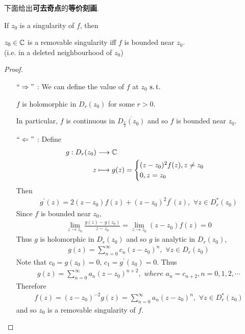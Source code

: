 	下面给出\textbf{可去奇点}的\textbf{等价刻画}.
	\begin{thm}\label{thm 8.3.1}
		If $z_0$ is a singularity of $f$, then 
		\begin{center}
			$z_0 \in \mathbb{C}$ is a removable singularity \hspace*{1em} iff \hspace*{1em} $f$ is bounded near $z_0$. \\
			(i.e. in a deleted neighbourhood of $z_0$)
		\end{center}
	
		\vspace{2em}
		\begin{proof}
			\begin{enumerate}
				\item[$``\Rightarrow"$]: We can define the value of $f$ at $z_0$ $\operatorname{s.t.}$
				\begin{center}
					$f$ is holomorphic in $D_{r}(z_0)$ for some $r > 0$.
				\end{center}
				In particular, $f$ is continuous in $\overline{D_{\frac{r}{2}}(z_0)}$ and so $f$ is bounded near $z_0$.
				
				\vspace{2em}
				\item[$`` \Leftarrow "$]: Define
				\begin{align}
					g : D_{r}(z_0) &\longrightarrow \mathbb{C} \\
					z &\longmapsto g(z) = 
					\begin{cases}
						(z - z_0)^2 f(z) , z \neq z_0 \\
						0 , z = z_0
					\end{cases}
				\end{align}
				Then
				\begin{align}
					g^{'}(z) = 2(z - z_0)f(z) + (z - z_0)^2 f^{'}(z) , \,\, \forall z \in D_{r}^{*}(z_0)
				\end{align}
				Since $f$ is bounded near $z_0$,
				\begin{align}
					\lim_{z \to z_0}{\frac{g(z) - g(z_0)}{z - z_0}}
					= \lim_{z \to z_0}{(z - z_0)f(z)}
					= 0
				\end{align}
				Thus $g$ is holomorphic in $D_{r}(z_0)$ and so $g$ is analytic in $D_{r}(z_0)$,
				\begin{align}
					g(z) = \sum_{n = 0}^{\infty}{c_n (z - z_0)^n},  \,\, \forall z \in D_{r}(z_0)
				\end{align}
				Note that $c_0 = g(z_0) = 0$, $c_1 = g^{'}(z_0) = 0$. Thus
				\begin{align}
					g(z) = \sum_{n = 0}^{\infty}{a_n (z - z_0)^{n + 2}}, \,\, where \,\, a_n = c_{n + 2}, n = 0 , 1 , 2 , \cdots
				\end{align}
				Therefore
				\begin{align}
					f(z) = (z - z_0)^{-2} g(z) = \sum_{n = 0}^{\infty}{a_n (z - z_0)^n} , \,\, \forall z \in D_{r}^{*}(z_0)
				\end{align}
				and so $z_0$ is a removable singularity of $f$.
			\end{enumerate}
		\end{proof}
	\end{thm}

